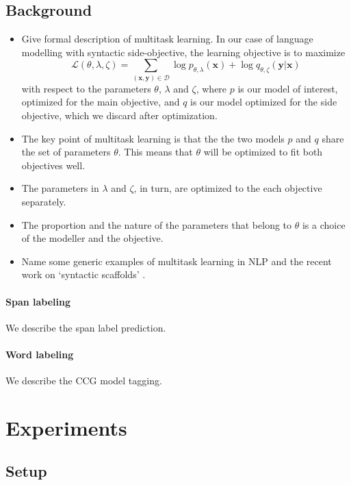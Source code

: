 \subsection{Background}
\begin{itemize}
  \item Give formal description of multitask learning. In our case of language modelling with syntactic side-objective, the learning objective is to maximize
  \begin{equation*}
    \mathcal{L}(\theta, \lambda, \zeta) = \sum_{ (\mathbf{x}, \mathbf{y}) \in \mathcal{D} }\log p_{\theta, \lambda}(\mathbf{x}) + \log q_{\theta,\zeta}(\mathbf{y} | \mathbf{x})
  \end{equation*}
  with respect to the parameters $\theta$, $\lambda$ and $\zeta$, where $p$ is our model of interest, optimized for the main objective, and $q$ is our model optimized for the side objective, which we discard after optimization.
  \item The key point of multitask learning is that the the two models $p$ and $q$ share the set of parameters $\theta$. This means that $\theta$ will be optimized to fit both objectives well.
  \item The parameters in $\lambda$ and $\zeta$, in turn, are optimized to the each objective separately.
  \item The proportion and the nature of the parameters that belong to $\theta$ is a choice of the modeller and the objective.
  \item Name some generic examples of multitask learning in NLP \citep{Zhang+2016:multitask,Goldberg+2016:multitask} and the recent work on `syntactic scaffolds' \citep{Swayamdipta+2018:scaffold}.
\end{itemize}

\paragraph{Span labeling}
We describe the span label prediction.

\paragraph{Word labeling}
We describe the CCG model tagging.


\section{Experiments}

\subsection{Setup}
